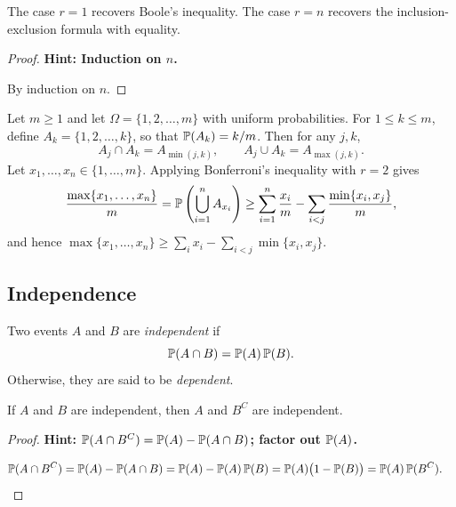 \documentclass[a4paper]{article}
\begin{document}
\begin{remark}
  The case $r = 1$ recovers Boole's inequality. The case $r = n$ recovers the inclusion-exclusion formula with equality.
\end{remark}

\begin{proof}
  \textbf{Hint: Induction on $n$.}

  By induction on $n$.
\end{proof}

\begin{eg}
  Let $m \geq 1$ and let $\Omega = \{1, 2, \dotsc, m\}$ with uniform probabilities. For $1 \leq k \leq m$, define $A_k = \{1, 2, \dotsc, k\}$, so that $\P(A_k) = k/m$. Then for any $j, k$,
  \[
    A_j \cap A_k = A_{\min(j, k)}, \qquad A_j \cup A_k = A_{\max(j, k)}.
  \]
  Let $x_1, \dotsc, x_n \in \{1, \dotsc, m\}$. Applying Bonferroni's inequality with $r = 2$ gives
  \[
    \frac{\max\{x_1, \dotsc, x_n\}}{m} = \P\left(\bigcup_{i=1}^{n} A_{x_{i}}\right) \geq \sum_{i=1}^{n} \frac{x_i}{m} - \sum_{i < j} \frac{\min\{x_i, x_j\}}{m},
  \]
  and hence $\max\{x_1, \dotsc, x_n\} \geq \sum_i x_i - \sum_{i < j} \min\{x_i, x_j\}$.
\end{eg}

\subsection{Independence}

\begin{defi}
  Two events $A$ and $B$ are \emph{independent} if
  \[
    \P(A\cap B) = \P(A)\,\P(B).
  \]
  Otherwise, they are said to be \emph{dependent}.
\end{defi}

\begin{prop}
  If $A$ and $B$ are independent, then $A$ and $B^C$ are independent.
\end{prop}

\begin{proof}
  \textbf{Hint: $\P(A \cap B^C) = \P(A) - \P(A \cap B)$; factor out $\P(A)$.}

  \begin{align*}
    \P(A\cap B^C) &= \P(A) - \P(A\cap B) = \P(A) - \P(A)\,\P(B) = \P(A)\bigl(1 - \P(B)\bigr) = \P(A)\,\P(B^C).\qedhere
  \end{align*}
\end{proof}
\end{document}
